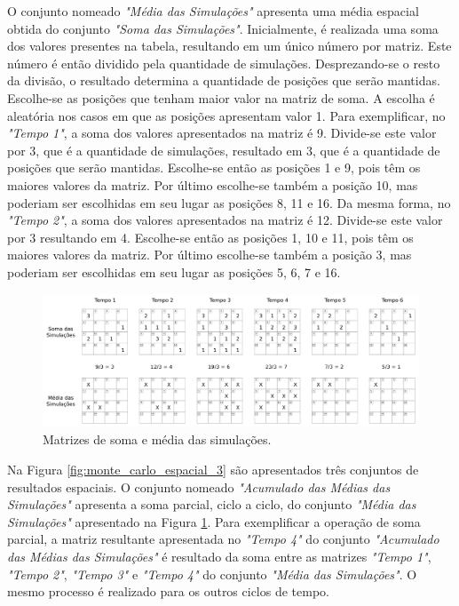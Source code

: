O conjunto nomeado \textit{"Média das Simulações"} apresenta uma média espacial obtida do conjunto \textit{"Soma das Simulações"}. Inicialmente, é realizada uma soma dos valores presentes na tabela, resultando em um único número por matriz. Este número é então dividido pela quantidade de simulações. Desprezando-se o resto da divisão, o resultado determina a quantidade de posições que serão mantidas. Escolhe-se as posições que tenham maior valor na matriz de soma. A escolha é aleatória nos casos em que as posições apresentam valor 1. Para exemplificar, no \textit{"Tempo 1"}, a soma dos valores apresentados na matriz é 9. Divide-se este valor por 3, que é a quantidade de simulações, resultado em 3, que é a quantidade de posições que serão mantidas. Escolhe-se então as posições 1 e 9, pois têm os maiores valores da matriz. Por último escolhe-se também a posição 10, mas poderiam ser escolhidas em seu lugar as posições 8, 11 e 16. Da mesma forma, no \textit{"Tempo 2"}, a soma dos valores apresentados na matriz é 12. Divide-se este valor por 3 resultando em 4. Escolhe-se então as posições 1, 10 e 11, pois têm os maiores valores da matriz. Por último escolhe-se também a posição 3, mas poderiam ser escolhidas em seu lugar as posições 5, 6, 7 e 16.

\begin{figure}[H]
  \centering
  \includegraphics[width=1\textwidth]{Figuras/Observacoes/MonteCarloEspacial/folha2.png}
  \caption{Matrizes de soma e média das simulações. }
  \label{fig:monte_carlo_espacial_2}
\end{figure} 

Na Figura \ref{fig:monte_carlo_espacial_3} são apresentados três conjuntos de resultados espaciais. O conjunto nomeado \textit{"Acumulado das Médias das Simulações"} apresenta a soma parcial, ciclo a ciclo, do conjunto \textit{"Média das Simulações"} apresentado na Figura \ref{fig:monte_carlo_espacial_2}. Para exemplificar a operação de soma parcial, a matriz resultante apresentada no \textit{"Tempo 4"} do conjunto \textit{"Acumulado das Médias das Simulações"} é resultado da soma entre as matrizes \textit{"Tempo 1"}, \textit{"Tempo 2"}, \textit{"Tempo 3"} e \textit{"Tempo 4"} do conjunto \textit{"Média das Simulações"}. O mesmo processo é realizado para os outros ciclos de tempo. 

